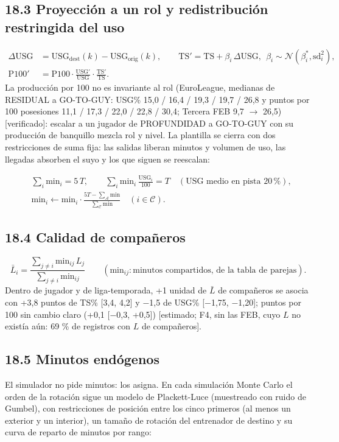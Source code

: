 \documentclass[10pt,a4paper]{article}
\begin{document}
\subsection*{18.3 Proyección a un rol y redistribución restringida del uso}
\[
\begin{aligned} \Delta\mathrm{USG} &= \mathrm{USG}_{\mathrm{dest}}(k) - \mathrm{USG}_{\mathrm{orig}}(k), \qquad \mathrm{TS}' = \mathrm{TS} + \beta_i\,\Delta\mathrm{USG},\ \ \beta_i \sim \mathcal N(\beta^{*}_i, \mathrm{sd}_i^2),\\ \mathrm{P100}' &= \mathrm{P100}\cdot\frac{\mathrm{USG}'}{\mathrm{USG}}\cdot\frac{\mathrm{TS}'}{\mathrm{TS}} . \end{aligned}
\]
La producción por 100 no es invariante al rol (EuroLeague, medianas de RESIDUAL a GO-TO-GUY: USG\% 15,0 / 16,4 / 19,3 / 19,7 / 26,8 y puntos por 100 posesiones 11,1 / 17,3 / 22,0 / 22,8 / 30,4; Tercera FEB 9,7 \ensuremath{\to} 26,5) [verificado]: escalar a un jugador de PROFUNDIDAD a GO-TO-GUY con su producción de banquillo mezcla rol y nivel. La plantilla se cierra con dos restricciones de suma fija: las salidas liberan minutos y volumen de uso, las llegadas absorben el suyo y los que siguen se reescalan:

\[
\begin{aligned} &\textstyle\sum_i \mathrm{min}_i = 5\,T, \qquad \sum_i \mathrm{min}_i\,\frac{\mathrm{USG}_i}{100} = T \quad (\text{USG medio en pista } 20\,\%),\\ &\mathrm{min}_i \leftarrow \mathrm{min}_i \cdot \frac{5T - \sum_{\mathcal A}\mathrm{min}}{\sum_{\mathcal C}\mathrm{min}} \quad (i \in \mathcal C) . \end{aligned}
\]
\subsection*{18.4 Calidad de compañeros}
\[
\bar L_i = \frac{\sum_{j \ne i} \mathrm{min}_{ij}\,L_j}{\sum_{j \ne i} \mathrm{min}_{ij}} \qquad (\mathrm{min}_{ij}: \text{minutos compartidos, de la tabla de parejas}) .
\]
Dentro de jugador y de liga-temporada, +1 unidad de $\bar L$ de compañeros se asocia con +3,8 puntos de TS\% [3,4, 4,2] y \ensuremath{-}1,5 de USG\% [\ensuremath{-}1,75, \ensuremath{-}1,20]; puntos por 100 sin cambio claro (+0,1 [\ensuremath{-}0,3, +0,5]) [estimado; F4, sin las FEB, cuyo $L$ no existía aún: 69 \% de registros con $L$ de compañeros].

\subsection*{18.5 Minutos endógenos}
El simulador no pide minutos: los asigna. En cada simulación Monte Carlo el orden de la rotación sigue un modelo de Plackett-Luce (muestreado con ruido de Gumbel), con restricciones de posición entre los cinco primeros (al menos un exterior y un interior), un tamaño de rotación del entrenador de destino y su curva de reparto de minutos por rango:
\end{document}
